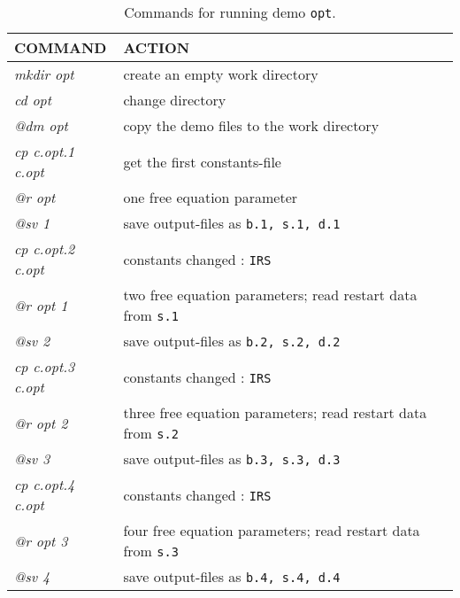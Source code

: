 \documentclass[12pt]{report}
\begin{document}
\begin{table}[htbp]
\begin{center}
\begin{tabular}{| l | l |}
\hline
  COMMAND  & ACTION \\
\hline
  {\it mkdir opt} & create an empty work directory \\ 
  {\it cd opt} & change directory \\
  {\it @dm opt} & copy the demo files to the work directory \\
\hline
  {\it cp c.opt.1 c.opt} & get the first constants-file \\ 
  {\it @r opt} & one free equation parameter \\ 
  {\it @sv 1} & save output-files as {\tt b.1, s.1, d.1} \\ 
\hline
  {\it cp c.opt.2 c.opt} & constants changed : {\tt IRS} \\ 
  {\it @r opt 1} & two free equation parameters; read restart data from {\tt s.1} \\ 
  {\it @sv 2} & save output-files as {\tt b.2, s.2, d.2} \\ 
\hline
  {\it cp c.opt.3 c.opt} & constants changed : {\tt IRS} \\ 
  {\it @r opt 2} & three free equation parameters; read restart data from {\tt s.2} \\ 
  {\it @sv 3} & save output-files as {\tt b.3, s.3, d.3} \\ 
\hline
  {\it cp c.opt.4 c.opt} & constants changed : {\tt IRS} \\ 
  {\it @r opt 3} & four free equation parameters; read restart data from {\tt s.3} \\ 
  {\it @sv 4} & save output-files as {\tt b.4, s.4, d.4} \\ 
\hline
\end{tabular}
\caption{Commands for running demo {\tt opt}.}
\label{tbl:demo_opt}
\end{center}
\end{table}

\newpage
\end{document}
